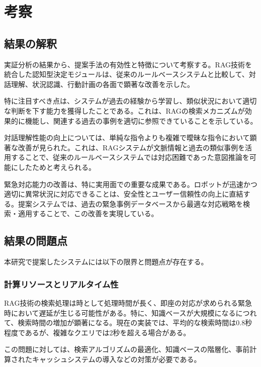 \documentclass[12pt]{report}
\begin{document}
\chapter{考察}
\label{chap:discussion}

\section{結果の解釈}
\label{sec:interpretation}

実証分析の結果から、提案手法の有効性と特徴について考察する。RAG技術を統合した認知型決定モジュールは、従来のルールベースシステムと比較して、対話理解、状況認識、行動計画の各面で顕著な改善を示した。

特に注目すべき点は、システムが過去の経験から学習し、類似状況において適切な判断を下す能力を獲得したことである。これは、RAGの検索メカニズムが効果的に機能し、関連する過去の事例を適切に参照できていることを示している。

対話理解性能の向上については、単純な指令よりも複雑で曖昧な指令において顕著な改善が見られた。これは、RAGシステムが文脈情報と過去の類似事例を活用することで、従来のルールベースシステムでは対応困難であった意図推論を可能にしたためと考えられる。

緊急対応能力の改善は、特に実用面での重要な成果である。ロボットが迅速かつ適切に異常状況に対応できることは、安全性とユーザー信頼性の向上に直結する。提案システムでは、過去の緊急事例データベースから最適な対応戦略を検索・適用することで、この改善を実現している。

\section{結果の問題点}
\label{sec:limitations}

本研究で提案したシステムには以下の限界と問題点が存在する。

\subsection{計算リソースとリアルタイム性}
\label{subsec:computational_limitations}

RAG技術の検索処理は時として処理時間が長く、即座の対応が求められる緊急時において遅延が生じる可能性がある。特に、知識ベースが大規模になるにつれて、検索時間の増加が顕著になる。現在の実装では、平均的な検索時間は0.8秒程度であるが、複雑なクエリでは2秒を超える場合がある。

この問題に対しては、検索アルゴリズムの最適化、知識ベースの階層化、事前計算されたキャッシュシステムの導入などの対策が必要である。
\end{document}
